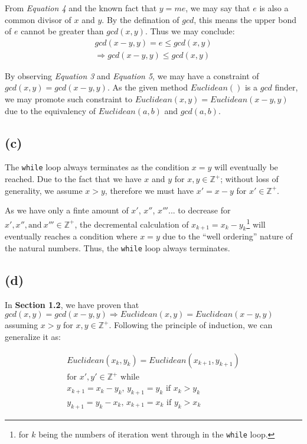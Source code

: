 \documentclass[12pt]{article}
\newcommand{\inlinecode}{\texttt}
\begin{document}
From \textit{Equation 4} and the known fact that $y = me$, we may say that $e$ is also a common divisor of $x$ and $y$. By the defination of $gcd$, this means the upper bond of $e$ cannot be greater than $gcd(x, y)$. Thus we may conclude:
\begin{gather}
    gcd(x-y, y) = e \leq gcd(x, y) \nonumber  \\
    \Rightarrow gcd(x-y, y) \leq gcd(x, y)
\end{gather}

By observing \textit{Equation 3} and \textit{Equation 5}, we may have a constraint of $gcd(x, y) = gcd(x-y, y)$. As the given method $Euclidean()$ is a $gcd$ finder, we may promote such constraint to $Euclidean(x, y) = Euclidean(x - y, y)$ due to the equivalency of $Euclidean(a, b)$ and $gcd(a, b)$.

\subsection{(c)}

The \inlinecode{while} loop always terminates as the condition $x = y$ will eventually be reached. Due to the fact that we have $x$ and $y$ for $x, y \in \mathbb{Z^+}$; without loss of generality, we assume $x > y$, therefore we must have $x' = x - y$ for $x' \in \mathbb{Z^+}$.

As we have only a finte amount of $x'$, $x''$, $x'''$... to decrease for $x', x'', \text{and}\ x''' \in \mathbb{Z^+}$, the decremental calculation of $x_{k+1} = x_{k} - y_{k}$\footnote{for $k$ being the numbers of iteration went through in the \inlinecode{while} loop.} will eventually reaches a condition where $x = y$ due to the ``well ordering'' nature of the natural numbers. Thus, the \inlinecode{while} loop always terminates.

\subsection{(d)}

In \textbf{Section 1.2}, we have proven that $gcd(x, y) = gcd(x-y, y) \Rightarrow Euclidean(x, y) = Euclidean(x - y, y)$ assuming $x > y$ for $x, y \in \mathbb{Z^+}$. Following the principle of induction, we can generalize it as:

\begin{gather}
    Euclidean(x_k, y_k) = Euclidean(x_{k+1}, y_{k+1}) \\
    \text{for $x', y' \in \mathbb{Z^+}$ while } \nonumber \\
    \text{$x_{k+1} = x_{k} - y_{k}$, $y_{k+1} = y_{k}$ \ \ \  if $x_{k} > y_{k}$} \nonumber \\
    \text{$y_{k+1} = y_{k} - x_{k}$, $x_{k+1} = x_{k}$ \ \ \  if $y_{k} > x_{k}$} \nonumber
\end{gather}
\end{document}
